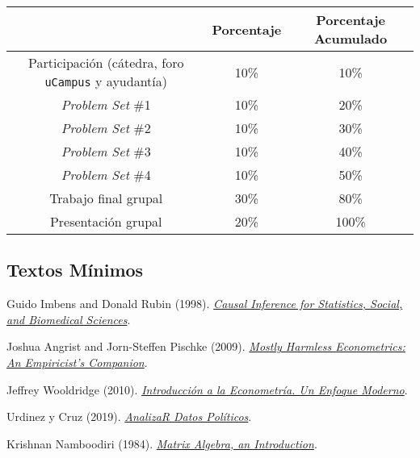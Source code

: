 \documentclass[letterpaper]{article}
\renewenvironment{itemize}{
  \begin{list}{}{
    \setlength{\leftmargin}{1.5em}
  }
}{
  \end{list}
}
\begin{document}
\begin{table}[H]
\centering
\begin{tabular}{ccc}
							& \textbf{Porcentaje} & {\bf Porcentaje Acumulado} \\
							\hline
Participaci\'on (c\'atedra, foro \texttt{uCampus} y ayudant\'ia) 	 & 10\%       	 & 10\% \\
\hline
\emph{Problem Set} \#1 													 & 10\% 		 & 20\%  \\
\emph{Problem Set} \#2 													 & 10\% 		 & 30\%  \\
\emph{Problem Set} \#3 													 & 10\% 		 & 40\%  \\
\emph{Problem Set} \#4 													 & 10\% 		 & 50\%  \\
\hline
Trabajo final grupal 												 & 30\% 	 	 & 80\% \\
Presentaci\'on grupal												 & 20\% 	 	 & 100\% \\
\hline             
\end{tabular}
\end{table}


\subsection*{Textos M\'inimos}

\begin{itemize}
  \item[$\bullet$] Guido Imbens and Donald Rubin (1998). \href{https://github.com/hbahamonde/OLS/raw/master/Readings/Imbens_Rubin.pdf}{\emph{Causal Inference for Statistics, Social, and Biomedical Sciences}}.
  \item[$\bullet$] Joshua Angrist and Jorn-Steffen Pischke (2009). \href{https://github.com/hbahamonde/OLS/raw/master/Readings/MHE.pdf}{\emph{Mostly Harmless Econometrics: An Empiricist's Companion}}.
  \item[$\bullet$] Jeffrey Wooldridge (2010). \href{https://github.com/hbahamonde/OLS/raw/master/Readings/Wooldridge.pdf}{\emph{Introducci\'on a la Econometr\'ia. Un Enfoque Moderno}}.
  \item[$\bullet$] Urdinez y Cruz (2019). \href{https://arcruz0.github.io/libroadp/index.html}{\emph{AnalizaR Datos Pol\'iticos}}.
  \item[$\bullet$] Krishnan Namboodiri (1984). \href{https://github.com/hbahamonde/OLS/raw/master/Readings/Namboodiri.pdf}{\emph{Matrix Algebra, an Introduction}}.

\end{itemize}
\end{document}
